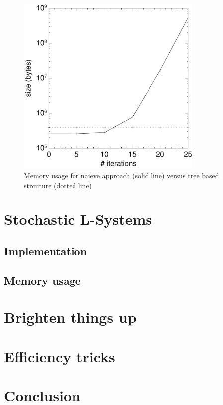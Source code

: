 \documentclass[11pt,a4paper]{article}
\begin{document}
\begin{figure}[h!]
  \centering
  \includegraphics[width=0.8\textwidth]{bench.pdf}
  \caption{Memory usage for naieve approach (solid line) versus tree based strcuture (dotted line)}
  \label{fig:bench}
\end{figure}

\section{Stochastic L-Systems} %
\subsection{Implementation}
\subsection{Memory usage}

\section{Brighten things up} %

\section{Efficiency tricks}

\section{Conclusion}

\newpage
\begin{appendix}
\listoffigures
\end{appendix}
\end{document}
